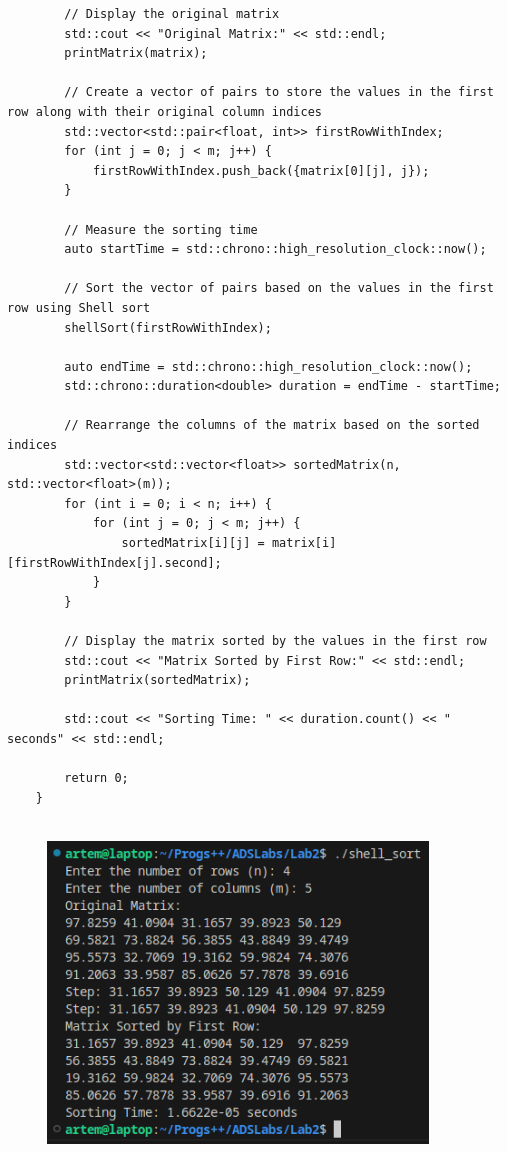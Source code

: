 \documentclass[12pt]{extarticle}
\begin{document}
{\begin{verbatim}
        // Display the original matrix
        std::cout << "Original Matrix:" << std::endl;
        printMatrix(matrix);
    
        // Create a vector of pairs to store the values in the first row along with their original column indices
        std::vector<std::pair<float, int>> firstRowWithIndex;
        for (int j = 0; j < m; j++) {
            firstRowWithIndex.push_back({matrix[0][j], j});
        }
    
        // Measure the sorting time
        auto startTime = std::chrono::high_resolution_clock::now();
    
        // Sort the vector of pairs based on the values in the first row using Shell sort
        shellSort(firstRowWithIndex);
    
        auto endTime = std::chrono::high_resolution_clock::now();
        std::chrono::duration<double> duration = endTime - startTime;
    
        // Rearrange the columns of the matrix based on the sorted indices
        std::vector<std::vector<float>> sortedMatrix(n, std::vector<float>(m));
        for (int i = 0; i < n; i++) {
            for (int j = 0; j < m; j++) {
                sortedMatrix[i][j] = matrix[i][firstRowWithIndex[j].second];
            }
        }
    
        // Display the matrix sorted by the values in the first row
        std::cout << "Matrix Sorted by First Row:" << std::endl;
        printMatrix(sortedMatrix);
    
        std::cout << "Sorting Time: " << duration.count() << " seconds" << std::endl;
    
        return 0;
    }
    
\end{verbatim}
}
\vspace{12pt}
\begin{figure}[H]
    \centering
    \includegraphics[width=0.90\textwidth]{Screenshot_20231010_195127.png}
    \caption{}
\end{figure}
\end{document}
